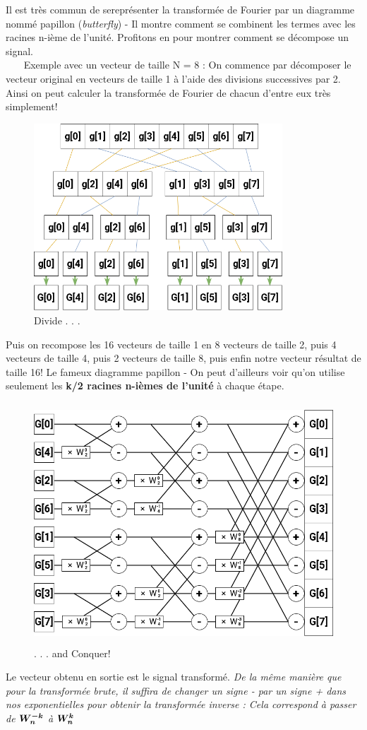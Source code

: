 \documentclass{article}
\begin{document}
Il est très commun de sereprésenter la transformée de Fourier par un diagramme nommé papillon (\textit{butterfly}) - Il montre comment se combinent les termes avec les racines n-ième de l'unité. Profitons en pour montrer comment se décompose un signal. 
\\~~~
\noindent Exemple avec un vecteur de taille N = 8 :
\newpage \noindent On commence par décomposer le vecteur original en vecteurs de taille 1 à l'aide des divisions successives par 2. Ainsi on peut calculer la transformée de Fourier de chacun d'entre eux très simplement!
\begin{figure}[!htb]
	\centering
	\includegraphics[height=7cm]{./assets/divide.png}
	\caption{Divide . . .}
	\label{fig:divide}
\end{figure}

\noindent Puis on recompose les 16 vecteurs de taille 1 en 8 vecteurs de taille 2, puis 4 vecteurs de taille 4, puis 2 vecteurs de taille 8, puis enfin notre vecteur résultat de taille 16! Le fameux diagramme papillon - On peut d'ailleurs voir qu'on utilise seulement les \textbf{k/2 racines n-ièmes de l'unité} à chaque étape.

\begin{figure}[!htb]
	\centering
	\includegraphics[height=9cm]{./assets/conquer.png}
	\caption{. . . and Conquer!}
	\label{fig:conquer}
\end{figure}

\noindent Le vecteur obtenu en sortie est le signal transformé.\textit{ De la même manière que pour la transformée brute, il suffira de changer un signe - par un signe + dans nos exponentielles pour obtenir la transformée inverse : Cela correspond à passer de $\bm{\krootofunity{-k}{n}}$ à $\bm{\krootofunity{k}{n}}$}
\end{document}

